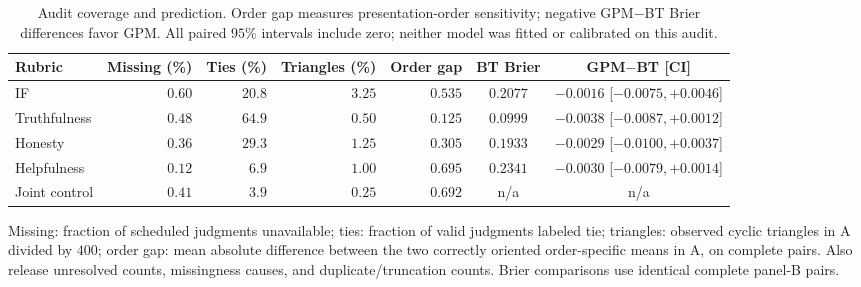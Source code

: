 \documentclass{article}
\theoremstyle{remark}
\theoremstyle{plain}
\begin{document}
\begin{table}[htbp]
\centering\footnotesize
\setlength{\tabcolsep}{3.4pt}
\caption{Audit coverage and prediction. Order gap measures presentation-order sensitivity; negative GPM$-$BT Brier differences favor GPM. All paired $95\%$ intervals include zero; neither model was fitted or calibrated on this audit.}
\label{tab:within-rubric-quality}
\begin{tabular}{lrrrrcc}
\toprule
Rubric & Missing (\%) & Ties (\%) & Triangles (\%) & Order gap & BT Brier & GPM$-$BT [CI]\\
\midrule
IF & $0.60$ & $20.8$ & $3.25$ & $0.535$ & $0.2077$ & $-0.0016$ [$-0.0075,+0.0046$]\\
Truthfulness & $0.48$ & $64.9$ & $0.50$ & $0.125$ & $0.0999$ & $-0.0038$ [$-0.0087,+0.0012$]\\
Honesty & $0.36$ & $29.3$ & $1.25$ & $0.305$ & $0.1933$ & $-0.0029$ [$-0.0100,+0.0037$]\\
Helpfulness & $0.12$ & $6.9$ & $1.00$ & $0.695$ & $0.2341$ & $-0.0030$ [$-0.0079,+0.0014$]\\
Joint control & $0.41$ & $3.9$ & $0.25$ & $0.692$ & n/a & n/a\\
\bottomrule
\end{tabular}
\smallskip
\parbox{0.97\linewidth}{\scriptsize Missing: fraction of scheduled judgments unavailable; ties: fraction of valid judgments labeled tie; triangles: observed cyclic triangles in A divided by $400$; order gap: mean absolute difference between the two correctly oriented order-specific means in A, on complete pairs. Also release unresolved counts, missingness causes, and duplicate/truncation counts. Brier comparisons use identical complete panel-B pairs.}
\end{table}
\end{document}
